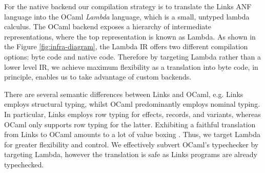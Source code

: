 \documentclass[12pt,mscres,cdtppar,twoside,openright,logo,rightchapter,normalheadings]{infthesis}
\theoremstyle{definition}
\begin{document}
%

For the native backend our compilation strategy is to translate the
Links ANF language into the OCaml \emph{Lambda} language, which is a
small, untyped lambda calculus. The OCaml backend exposes a hierarchy
of intermediate representations, where the top representation is known
as Lambda. As shown in the Figure \ref{fig:infra-diagram}, the Lambda
IR offers two different compilation options: byte code and native
code. Therefore by targeting Lambda rather than a lower level IR, we
achieve maximum flexibility as a translation into byte code, in
principle, enables us to take advantage of custom backends.

%

There are several semantic differences between Links and OCaml,
e.g. Links employs structural typing, whilst OCaml predominantly
employs nominal typing.  In particular, Links employs row typing for
effects, records, and variants, whereas OCaml only supports row typing
for the latter. Exhibiting a faithful translation from Links to OCaml
amounts to a lot of value boxing \citep{Hol09}. Thus, we target Lambda
for greater flexibility and control.  We effectively subvert OCaml's
typechecker by targeting Lambda, however the translation is safe as
Links programs are already typechecked.


\end{document}

